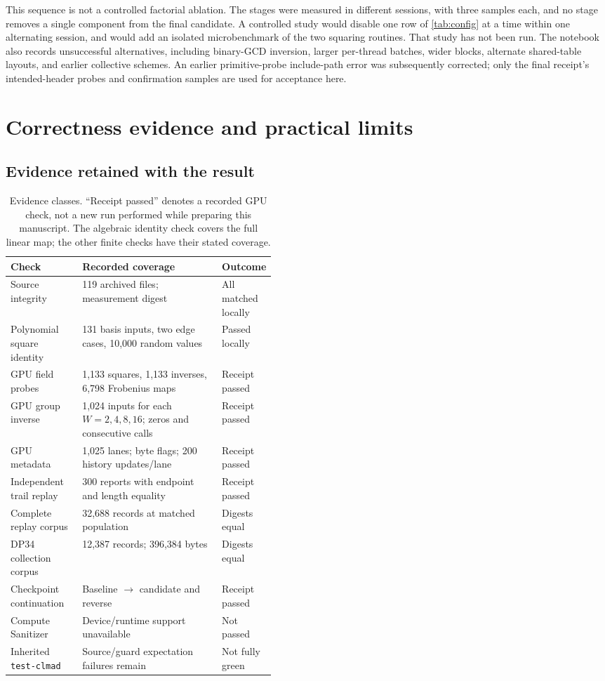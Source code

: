 \documentclass[11pt,a4paper]{article}
\newcommand{\code}[1]{\texttt{\small #1}}
\begin{document}
This sequence is not a controlled factorial ablation. The stages were measured in different sessions, with three samples each, and no stage removes a single component from the final candidate. A controlled study would disable one row of \cref{tab:config} at a time within one alternating session, and would add an isolated microbenchmark of the two squaring routines. That study has not been run. The notebook also records unsuccessful alternatives, including binary-GCD inversion, larger per-thread batches, wider blocks, alternate shared-table layouts, and earlier collective schemes. An earlier primitive-probe include-path error was subsequently corrected; only the final receipt's intended-header probes and confirmation samples are used for acceptance here.

\section{Correctness evidence and practical limits}
\subsection{Evidence retained with the result}
\begin{table}[t]
\centering\small
\begin{tabularx}{\linewidth}{@{}>{\raggedright\arraybackslash}p{0.27\linewidth}Y>{\raggedright\arraybackslash}p{0.17\linewidth}@{}}
\toprule
Check & Recorded coverage & Outcome\\
\midrule
Source integrity & 119 archived files; measurement digest & All matched locally\\
Polynomial square identity & 131 basis inputs, two edge cases, 10,000 random values & Passed locally\\
GPU field probes & 1,133 squares, 1,133 inverses, 6,798 Frobenius maps & Receipt passed\\
GPU group inverse & 1,024 inputs for each $W=2,4,8,16$; zeros and consecutive calls & Receipt passed\\
GPU metadata & 1,025 lanes; byte flags; 200 history updates/lane & Receipt passed\\
Independent trail replay & 300 reports with endpoint and length equality & Receipt passed\\
Complete replay corpus & 32,688 records at matched population & Digests equal\\
DP34 collection corpus & 12,387 records; 396,384 bytes & Digests equal\\
Checkpoint continuation & Baseline $\to$ candidate and reverse & Receipt passed\\
Compute Sanitizer & Device/runtime support unavailable & Not passed\\
Inherited \code{test-clmad} & Source/guard expectation failures remain & Not fully green\\
\bottomrule
\end{tabularx}
\caption{Evidence classes. ``Receipt passed'' denotes a recorded GPU check, not a new run performed while preparing this manuscript. The algebraic identity check covers the full linear map; the other finite checks have their stated coverage.}
\label{tab:validation}
\end{table}
\end{document}
